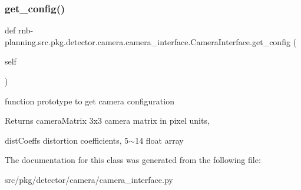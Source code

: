 \subsubsection{\texorpdfstring{get\+\_\+config()}{get\_config()}}
{\footnotesize\ttfamily def rnb-\/planning.\+src.\+pkg.\+detector.\+camera.\+camera\+\_\+interface.\+Camera\+Interface.\+get\+\_\+config (\begin{DoxyParamCaption}\item[{}]{self }\end{DoxyParamCaption})}



function prototype to get camera configuration 

\begin{DoxyReturn}{Returns}
camera\+Matrix 3x3 camera matrix in pixel units, 

dist\+Coeffs distortion coefficients, 5$\sim$14 float array 
\end{DoxyReturn}


The documentation for this class was generated from the following file\+:\begin{DoxyCompactItemize}
\item 
src/pkg/detector/camera/camera\+\_\+interface.\+py\end{DoxyCompactItemize}
